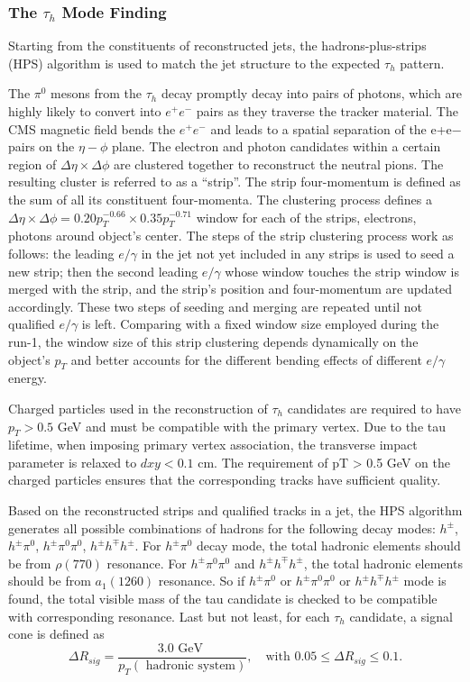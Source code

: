 \subsubsection{The $\tau_h$ Mode Finding}

Starting from the constituents of reconstructed jets, the hadrons-plus-strips (HPS) algorithm is used to match the jet structure to the expected $\tau_h$ pattern. 

The $\pi^0$ mesons from the $\tau_h$ decay promptly decay into pairs of photons, which are highly likely to convert into $e^+e^-$ pairs as they traverse the tracker material. The CMS magnetic field bends the $e^+e^-$ and leads to a spatial separation of the e+e− pairs on the $\eta-\phi$ plane. The electron and photon candidates within a certain region of $\Delta\eta \times \Delta \phi$  are clustered together to reconstruct the neutral pions. The resulting cluster is referred to as a “strip”. The strip four-momentum is defined as the sum of all its constituent four-momenta. The clustering process defines a $\Delta\eta \times \Delta \phi = 0.20p_T^{-0.66} \times 0.35 p_T^{-0.71}$ window for each of the strips, electrons, photons around object's center. The steps of the strip clustering process work as follows: the leading $e/\gamma$ in the jet not yet included in any strips is used to seed a new strip; then the second leading $e/\gamma$ whose window touches the strip window is merged with the strip, and the strip's position and four-momentum are updated accordingly. These two steps of seeding and merging are repeated until not qualified $e/\gamma$ is left. Comparing with a fixed window size employed during the run-1, the window size of this strip clustering depends dynamically on the object's $p_T$ and better accounts for the different bending effects of different $e/\gamma$ energy.

Charged particles used in the reconstruction of $\tau_h$ candidates are required to have $p_T>0.5$ GeV and must be compatible with the primary vertex. Due to the tau lifetime, when imposing primary vertex association, the transverse impact parameter is relaxed to $dxy<0.1$ cm. The requirement of pT > 0.5 GeV on the charged particles ensures that the corresponding tracks have sufficient quality.

Based on the reconstructed strips and qualified tracks in a jet, the HPS algorithm generates all possible combinations of hadrons for the following decay modes: $h^\pm$, $h^\pm \pi^0$, $h^\pm \pi^0 \pi^0$, $h^\pm h^\mp h^\pm$. For $h^\pm \pi^0$ decay mode, the total hadronic elements should be from $\rho(770)$ resonance. For $h^\pm \pi^0 \pi^0$ and $h^\pm h^\mp h^\pm$, the total hadronic elements should be from $a_1(1260)$ resonance. So if  $h^\pm \pi^0$ or $h^\pm \pi^0 \pi^0$ or $h^\pm h^\mp h^\pm$ mode is found, the total visible mass of the tau candidate is checked to be compatible with corresponding resonance. Last but not least, for each $\tau_h$ candidate, a signal cone is defined as
\begin{equation}
	\Delta R_{sig} = \frac{3.0 \text{ GeV } } { p_T (\text{ hadronic system})  }, \quad \text{with } 0.05 \leq \Delta R_{sig} \leq 0.1.
\end{equation}

